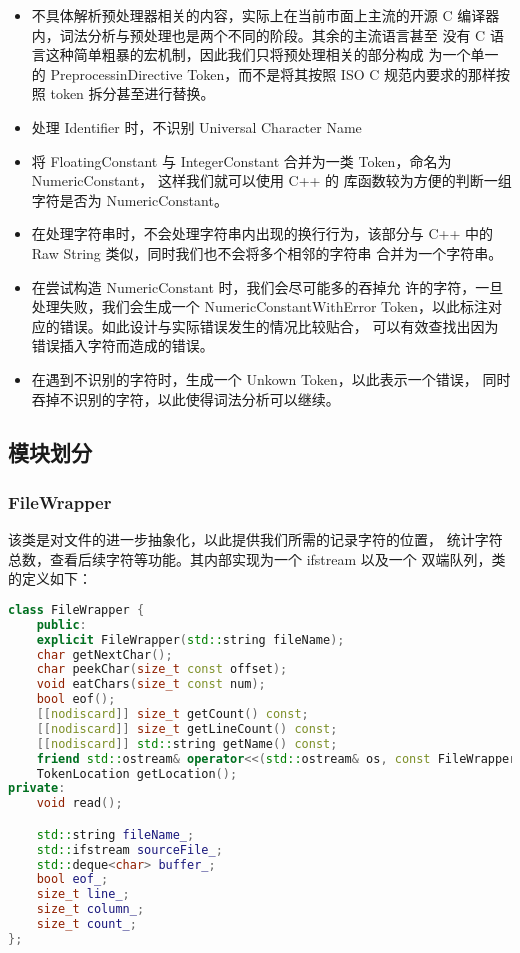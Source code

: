 \documentclass[blue,normal,cn]{elegantnote}
\begin{document}
\begin{itemize}
	\item 不具体解析预处理器相关的内容，实际上在当前市面上主流的开源 
	C 编译器内，词法分析与预处理也是两个不同的阶段。其余的主流语言甚至
	没有 C 语言这种简单粗暴的宏机制，因此我们只将预处理相关的部分构成
	为一个单一的 PreprocessinDirective Token，而不是将其按照 ISO 
	C 规范内要求的那样按照 token 拆分甚至进行替换。
	\item 处理 Identifier 时，不识别 Universal Character Name
	\item 将 FloatingConstant 与 IntegerConstant 合并为一类 
	Token，命名为 NumericConstant， 这样我们就可以使用 C++ 的
	库函数较为方便的判断一组字符是否为 NumericConstant。
	\item 在处理字符串时，不会处理字符串内出现的换行行为，该部分与
	 C++ 中的 Raw String 类似，同时我们也不会将多个相邻的字符串
	合并为一个字符串。
	\item 在尝试构造 NumericConstant 时，我们会尽可能多的吞掉允
	许的字符，一旦处理失败，我们会生成一个 NumericConstantWithError 
	Token，以此标注对应的错误。如此设计与实际错误发生的情况比较贴合，
	可以有效查找出因为错误插入字符而造成的错误。
	\item 在遇到不识别的字符时，生成一个 Unkown Token，以此表示一个错误，
	同时吞掉不识别的字符，以此使得词法分析可以继续。
\end{itemize}

\subsection{模块划分}

\subsubsection{FileWrapper}

该类是对文件的进一步抽象化，以此提供我们所需的记录字符的位置，
统计字符总数，查看后续字符等功能。其内部实现为一个 ifstream 
以及一个 双端队列，类的定义如下：

\begin{lstlisting}[language=C++]
class FileWrapper {
    public:
    explicit FileWrapper(std::string fileName);
    char getNextChar();
    char peekChar(size_t const offset);
    void eatChars(size_t const num);
    bool eof();
    [[nodiscard]] size_t getCount() const;
    [[nodiscard]] size_t getLineCount() const;
    [[nodiscard]] std::string getName() const;
    friend std::ostream& operator<<(std::ostream& os, const FileWrapper & fileWrapper);
    TokenLocation getLocation();
private:
    void read();

    std::string fileName_;
    std::ifstream sourceFile_;
    std::deque<char> buffer_;
    bool eof_;
    size_t line_;
    size_t column_;
    size_t count_;
};
\end{lstlisting}
\end{document}
